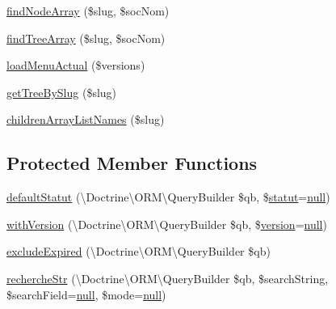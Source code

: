 \begin{DoxyCompactItemize}
\item 
\hyperlink{class_acme_group_1_1_labo_bundle_1_1_entity_1_1categorie_repository_abd3985cee50f78ceb36cc632d70f4012}{find\+Node\+Array} (\$slug, \$soc\+Nom)
\item 
\hyperlink{class_acme_group_1_1_labo_bundle_1_1_entity_1_1categorie_repository_a1c10a315ea1d06d3d72fac2832db209a}{find\+Tree\+Array} (\$slug, \$soc\+Nom)
\item 
\hyperlink{class_acme_group_1_1_labo_bundle_1_1_entity_1_1categorie_repository_a3360a01e34e4f4220be2e86c782d540b}{load\+Menu\+Actual} (\$versions)
\item 
\hyperlink{class_acme_group_1_1_labo_bundle_1_1_entity_1_1categorie_repository_aa863e396bedd6b5b02a76226d921a552}{get\+Tree\+By\+Slug} (\$slug)
\item 
\hyperlink{class_acme_group_1_1_labo_bundle_1_1_entity_1_1categorie_repository_afcdc0c786720cfe72b192cc7d9ba8c42}{children\+Array\+List\+Names} (\$slug)
\end{DoxyCompactItemize}
\subsection*{Protected Member Functions}
\begin{DoxyCompactItemize}
\item 
\hyperlink{class_acme_group_1_1_labo_bundle_1_1_entity_1_1categorie_repository_aeae1c3a4d992de74ee4fd2a5092d6ce2}{default\+Statut} (\textbackslash{}Doctrine\textbackslash{}\+O\+R\+M\textbackslash{}\+Query\+Builder \$qb, \$\hyperlink{class_acme_group_1_1_labo_bundle_1_1_entity_1_1statut}{statut}=\hyperlink{validate_8js_afb8e110345c45e74478894341ab6b28e}{null})
\item 
\hyperlink{class_acme_group_1_1_labo_bundle_1_1_entity_1_1categorie_repository_acbf6aec7653dd50d86ecdcdc7ed7efe2}{with\+Version} (\textbackslash{}Doctrine\textbackslash{}\+O\+R\+M\textbackslash{}\+Query\+Builder \$qb, \$\hyperlink{class_acme_group_1_1_labo_bundle_1_1_entity_1_1version}{version}=\hyperlink{validate_8js_afb8e110345c45e74478894341ab6b28e}{null})
\item 
\hyperlink{class_acme_group_1_1_labo_bundle_1_1_entity_1_1categorie_repository_ad00b1b678bd170bc637a2b59315b3bdd}{exclude\+Expired} (\textbackslash{}Doctrine\textbackslash{}\+O\+R\+M\textbackslash{}\+Query\+Builder \$qb)
\item 
\hyperlink{class_acme_group_1_1_labo_bundle_1_1_entity_1_1categorie_repository_a022de831cdea95d750e53232dba9e8b2}{recherche\+Str} (\textbackslash{}Doctrine\textbackslash{}\+O\+R\+M\textbackslash{}\+Query\+Builder \$qb, \$search\+String, \$search\+Field=\hyperlink{validate_8js_afb8e110345c45e74478894341ab6b28e}{null}, \$mode=\hyperlink{validate_8js_afb8e110345c45e74478894341ab6b28e}{null})
\end{DoxyCompactItemize}


